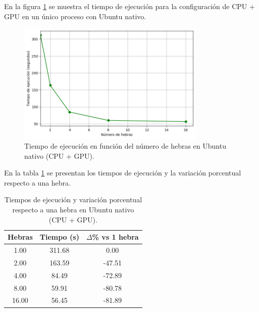 En la figura \ref{fig:single-node_ubuntu__gpu_native_time} se muestra el tiempo de ejecución para la configuración de CPU + GPU en un único proceso con Ubuntu nativo.

\begin{figure}[ht]
    \centering
    \includegraphics[width=0.8\textwidth]{imagenes/cap5/single-node_ubuntu_gpu_native_time.png}
    \caption{Tiempo de ejecución en función del número de hebras en Ubuntu nativo (CPU + GPU).}
    \label{fig:single-node_ubuntu__gpu_native_time}
\end{figure}

En la tabla \ref{tab:single-node_ubuntu_gpu_native} se presentan los tiempos de ejecución y la variación porcentual respecto a una hebra.

\begin{table}[ht]
    \centering
    \begin{tabular}{|c|c|c|}
        \hline
        \textbf{Hebras} & \textbf{Tiempo (s)} & \textbf{$\Delta$\% vs 1 hebra} \\
        \hline
        1.00            & 311.68              & 0.00                           \\
        2.00            & 163.59              & -47.51                         \\
        4.00            & 84.49               & -72.89                         \\
        8.00            & 59.91               & -80.78                         \\
        16.00           & 56.45               & -81.89                         \\
        \hline
    \end{tabular}
    \caption{Tiempos de ejecución y variación porcentual respecto a una hebra en Ubuntu nativo (CPU + GPU).}
    \label{tab:single-node_ubuntu_gpu_native}
\end{table}

